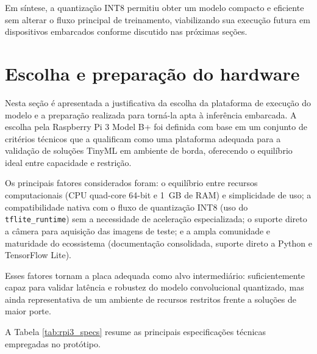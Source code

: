 \documentclass[repeatfields,xlists,xpacks,oneside]{ufrgscca}
\begin{document}
Em síntese, a quantização INT8 permitiu obter um modelo compacto e eficiente sem alterar o fluxo principal de treinamento, viabilizando sua execução futura em dispositivos embarcados conforme discutido nas próximas seções.

\section{Escolha e preparação do hardware}
\label{sec:hardware}
Nesta seção é apresentada a justificativa da escolha da plataforma de execução do modelo e a preparação realizada para torná-la apta à inferência embarcada. A escolha pela Raspberry Pi 3 Model B+ foi definida com base em um conjunto de critérios técnicos que a qualificam como uma plataforma adequada para a validação de soluções TinyML em ambiente de borda, oferecendo o equilíbrio ideal entre capacidade e restrição.

Os principais fatores considerados foram: o equilíbrio entre recursos computacionais (CPU quad-core 64-bit e 1~GB de RAM) e simplicidade de uso; a compatibilidade nativa com o fluxo de quantização INT8 (uso do \texttt{tflite\_runtime}) sem a necessidade de aceleração especializada; o suporte direto a câmera para aquisição das imagens de teste; e a ampla comunidade e maturidade do ecossistema (documentação consolidada, suporte direto a Python e TensorFlow Lite).

Esses fatores tornam a placa adequada como alvo intermediário: suficientemente capaz para validar latência e robustez do modelo convolucional quantizado, mas ainda representativa de um ambiente de recursos restritos frente a soluções de maior porte.

A Tabela \ref{tab:rpi3_specs} resume as principais especificações técnicas empregadas no protótipo.
\end{document}
